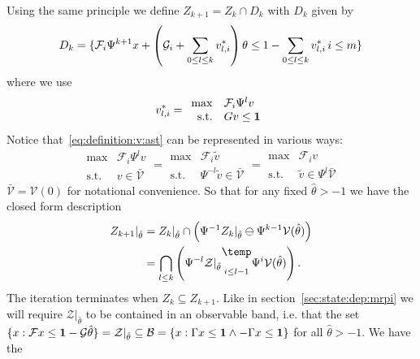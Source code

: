\documentclass[letterpaper, 10pt, conference]{ieeeconf} %
\newcommand{\bigominus}{\raisebox{10pt}{$\temp$}}
\begin{document}
%
Using the same principle we define $Z_{k+1}=Z_k\cap D_k$ with $D_k$ given by
%
\begin{equation}\label{eq:parametrised:Dk}\small
	D_k = \{\mathcal F_i\Psi^{k+1}x+ \left(\mathcal G_i +\sum_{0\leq l\leq k} v_{l,i}^\ast\right)\theta \leq 1 
	- \sum_{0\leq l\leq k} v_{l,i}^\ast\, i\leq m\}
\end{equation}
%
where we use 
%
\begin{equation}\label{eq:definition:v:ast}
v_{l,i}^\ast = \begin{array}{rl}\max & \mathcal F_i \Psi^{l} v \\ \text{s.t.}& Gv\leq{\bf{1}}
\end{array}
\end{equation}
%
Notice that~\eqref{eq:definition:v:ast} can be represented in various ways:
%
\[
\begin{array}{rl}
\max&\mathcal F_i \Psi^l v \\ \text{s.t.}&v\in\bar{\mathcal{V}}
\end{array} = 
\begin{array}{rl}
\max&\mathcal F_i \tilde  v \\ \text{s.t.}&\Psi^{-l} \tilde v\in\bar{\mathcal{V}}
\end{array} = 
\begin{array}{rl}
\max&\mathcal F_i v \\ \text{s.t.}& \tilde v\in\Psi^l\bar{\mathcal{V}}
\end{array}
\]
%
$\bar{\mathcal{V}}=\mathcal V(0)$ for notational convenience. So that for any fixed $\hat\theta>-1$
we have the closed form description
%
\begin{equation}\label{eq:closed:form:parametrised:iterates}
\begin{split}
	Z_{k+1}\vert_{\hat\theta} &= Z_{k}\vert_{\hat\theta}\cap\left(
	\Psi^{-1}Z_k\vert_{\hat\theta}\ominus\Psi^{k-1}\mathcal V(\hat\theta)\right)\\
	&=\bigcap_{l\leq k}\left(\Psi^{-l}\mathcal Z\vert_{\hat\theta}\underset{i\leq l-1}{\bigominus} 
	\Psi^i \mathcal V(\hat\theta)
	\right).
\end{split}
\end{equation}
%
The iteration terminates when $Z_k\subseteq Z_{k+1}$. Like in section~\ref{sec:state:dep:mrpi}
we will require $\mathcal Z\vert_{\hat\theta}$ to be contained in an observable band, i.e. that 
the set $\{x:\mathcal Fx \leq {\bf{1}}-\mathcal G\hat\theta\}=\mathcal Z\vert_{\hat\theta}\subseteq
\mathcal B=\{x:\Gamma x\leq {\bf{1}}\wedge -\Gamma x\leq {\bf{1}}\}$ for all $\hat\theta>-1$. We have the
\end{document}
